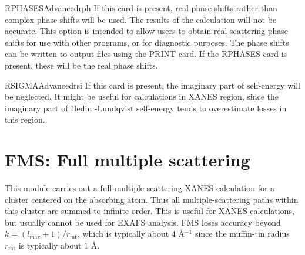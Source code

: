 \documentclass[11pt,oneside]{report} %
\begin{document}
\begin{Card}{RPHASES}{}{Advanced}{rph}
  If this card is present, real phase shifts rather than complex phase
  shifts will be used.  The results of the calculation will not be
  accurate.  This option is intended to allow users to obtain real
  scattering phase shifts for use with other programs, or for
  diagnostic purposes.  The phase shifts can be written to output
  files  using the PRINT card.  If the RPHASES card
  is present, these will be the real phase shifts.
\end{Card}


\begin{Card}{RSIGMA}{}{Advanced}{rsi}
  If this card is present, the imaginary part of self-energy will be neglected.
  It might be useful for calculations in XANES region, since the imaginary
  part of Hedin -Lundqvist self-energy tends to overestimate losses in this
  region.
\end{Card}


\section{FMS: Full multiple scattering}
\label{sec:Full-mult-scatt}

This module carries out a full multiple scattering XANES calculation
for a cluster centered on the absorbing atom.  Thus all
multiple-scattering paths within this cluster are summed to infinite
order.  This is useful for XANES calculations, but usually cannot be
used for EXAFS analysis.  FMS loses accuracy beyond $k =
(l_{\mathrm{max}}+1)/r_{\mathrm{mt}}$, which is typically about 4
\AA$^{-1}$ since the muffin-tin radius $r_{\mathrm{mt}}$ is
typically about 1 \AA.
\end{document}
